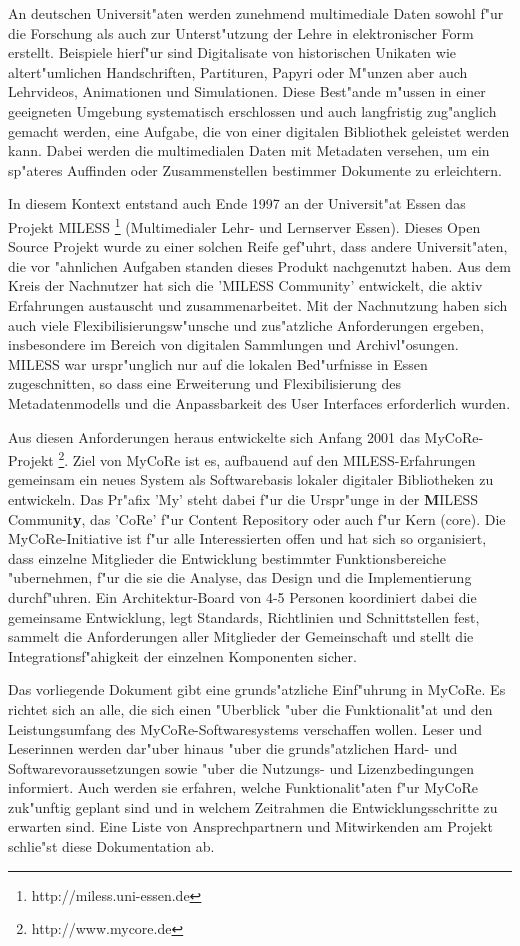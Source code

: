 An deutschen Universit"aten werden zunehmend multimediale Daten sowohl f"ur
die Forschung als auch zur Unterst"utzung der Lehre in elektronischer
Form erstellt.
Beispiele hierf"ur sind Digitalisate von historischen Unikaten wie
altert"umlichen Handschriften, Partituren, Papyri oder M"unzen
aber auch Lehrvideos, Animationen und Simulationen.
Diese Best"ande m"ussen in einer geeigneten Umgebung systematisch
erschlossen und auch langfristig zug"anglich gemacht werden, eine
Aufgabe, die von einer digitalen Bibliothek geleistet werden kann.
Dabei werden die multimedialen Daten mit Metadaten versehen, um ein 
sp"ateres Auffinden oder Zusammenstellen bestimmer Dokumente zu erleichtern.

In diesem Kontext entstand auch Ende 1997 an der Universit"at Essen
das Projekt MILESS \footnote{http://miless.uni-essen.de} (Multimedialer
Lehr- und Lernserver Essen).
Dieses Open Source Projekt wurde zu einer solchen Reife gef"uhrt, dass
andere Universit"aten, die vor "ahnlichen Aufgaben standen dieses Produkt
nachgenutzt haben.
Aus dem Kreis der Nachnutzer hat sich die 'MILESS Community' entwickelt,
die aktiv Erfahrungen austauscht und zusammenarbeitet.
Mit der Nachnutzung haben sich auch viele Flexibilisierungsw"unsche
und zus"atzliche Anforderungen ergeben, insbesondere im Bereich
von digitalen Sammlungen und Archivl"osungen.
MILESS war urspr"unglich nur auf die lokalen Bed"urfnisse in Essen
zugeschnitten, so dass eine Erweiterung und Flexibilisierung 
des Metadatenmodells und die Anpassbarkeit des User Interfaces 
erforderlich wurden.

Aus diesen Anforderungen heraus entwickelte sich Anfang 2001 das
MyCoRe-Projekt \footnote{http://www.mycore.de}. 
Ziel von MyCoRe ist es, aufbauend auf den MILESS-Erfahrungen gemeinsam
ein neues System als Softwarebasis lokaler digitaler Bibliotheken zu
entwickeln.
Das Pr"afix 'My' steht dabei f"ur die Urspr"unge in der {\bf M}ILESS
Communit{\bf y}, das 'CoRe' f"ur Content Repository oder auch f"ur
Kern (core).
Die MyCoRe-Initiative ist f"ur alle Interessierten offen und hat sich
so organisiert, dass einzelne Mitglieder die Entwicklung bestimmter
Funktionsbereiche "ubernehmen, f"ur die sie die Analyse, das Design und
die Implementierung durchf"uhren.
Ein Architektur-Board von 4-5 Personen koordiniert dabei die gemeinsame
Entwicklung, legt Standards, Richtlinien und Schnittstellen fest, sammelt
die Anforderungen aller Mitglieder der Gemeinschaft und stellt die 
Integrationsf"ahigkeit der einzelnen Komponenten sicher.

Das vorliegende Dokument gibt eine grunds"atzliche Einf"uhrung in MyCoRe. 
Es richtet sich an alle, die sich einen "Uberblick "uber die Funktionalit"at und den
Leistungsumfang des MyCoRe-Softwaresystems verschaffen wollen.
Leser und Leserinnen werden dar"uber hinaus "uber die 
grunds"atzlichen Hard- und Softwarevoraussetzungen sowie "uber die
Nutzungs- und Lizenzbedingungen informiert. 
Auch werden sie erfahren, welche Funktionalit"aten f"ur MyCoRe zuk"unftig
geplant sind und in welchem Zeitrahmen die Entwicklungsschritte zu erwarten sind.
Eine Liste von Ansprechpartnern und Mitwirkenden am Projekt schlie"st diese
Dokumentation ab.

